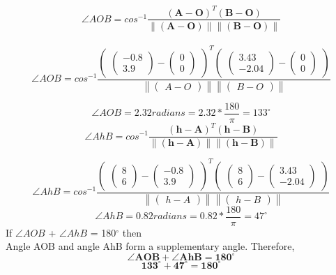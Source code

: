 \documentclass[journal,10pt,twocolumn]{article}
\providecommand{\norm}[1]{\left\lVert#1\right\rVert}
\let\vec\mathbf
\newcommand{\myvec}[1]{\ensuremath{\begin{pmatrix}#1\end{pmatrix}}}
\begin{document}
\begin{equation}
	\angle AOB = cos^{-1}\frac{(\vec{A}-\vec{O})^T(\vec{B}-\vec{O})}{\norm{(\vec{A}-\vec{O})}\norm{(\vec{B}-\vec{O})}}
\end{equation}\\
\begin{equation}
	\angle AOB = cos^{-1}\frac{\myvec{\myvec{-0.8\\3.9}-\myvec{0\\0}}^T \myvec{\myvec{3.43\\-2.04} - \myvec{0\\0}}}{\norm{\myvec{A-O}} \norm{\myvec{B-O}}}
\end{equation}

\begin{equation}
	\angle AOB = 2.32 radians = 2.32*\frac{180}{\pi} = 133^\circ
\end{equation}
\begin{equation}
	\angle AhB = cos^{-1}\frac{(\vec{h}-\vec{A})^T(\vec{h}-\vec{B})}{\norm{(\vec{h}-\vec{A})}\norm{(\vec{h}-\vec{B})}}
\end{equation}

\begin{equation}
	\angle AhB = cos^{-1}\frac{\myvec{\myvec{8\\6}-\myvec{-0.8\\3.9}}^T \myvec{\myvec{8\\6} - \myvec{3.43\\-2.04}}}{\norm{\myvec{h-A}} \norm{\myvec{h-B}}}
\end{equation}
\begin{equation}
	\angle AhB = 0.82 radians = 0.82*\frac{180}{\pi} = 47^\circ
\end{equation}
If $\angle AOB$ + $\angle AhB$ = 180$^\circ$ then \\
Angle AOB and angle AhB form a supplementary angle.
Therefore,
\begin{equation}
	\boldsymbol{\angle AOB + \angle AhB = 180^\circ}
\end{equation}
\begin{equation}
	\boldsymbol{133^\circ + 47^\circ = 180^\circ}
\end{equation}
\end{document}
